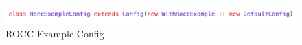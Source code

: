 \documentclass[../main.tex]{subfiles}
\begin{document}
\begin{figure}
    \centering
    \includegraphics[scale=.4]{pngs/ConfigSnipit.png}
    \caption{ROCC Example Config}
    \label{fig:configsnipit}
\end{figure}
\end{document}
